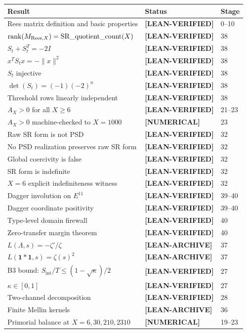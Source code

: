 \documentclass[11pt]{article}
\theoremstyle{remark}
\newcommand{\LEANVERIFIED}{\textbf{\color{green!60!black}[LEAN-VERIFIED]}}
\newcommand{\NUMERICAL}{\textbf{\color{orange}[NUMERICAL]}}
\newcommand{\LEANARCHIVE}{\textbf{\color{gray}[LEAN-ARCHIVE]}}
\DeclareRobustCommand{\_}{\ifmmode\text{\textunderscore}\else\textunderscore\allowbreak\fi}
\begin{document}
\begin{longtable}{p{8cm}ll}
\toprule
Result & Status & Stage \\
\midrule
Rees matrix definition and basic properties & \LEANVERIFIED{} & 0--10 \\
$\operatorname{rank}(M_{\mathrm{Rees},X}) = \mathrm{SR\_quotient\_count}(X)$ & \LEANVERIFIED{} & 38 \\
$S_t + S_t^T = -2I$ & \LEANVERIFIED{} & 38 \\
$x^T S_t x = -\|x\|^2$ & \LEANVERIFIED{} & 38 \\
$S_t$ injective & \LEANVERIFIED{} & 38 \\
$\det(S_t) = (-1)(-2)^n$ & \LEANVERIFIED{} & 38 \\
Threshold rows linearly independent & \LEANVERIFIED{} & 38 \\
$A_X > 0$ for all $X \geq 6$ & \LEANVERIFIED{} & 21--23 \\
$A_X > 0$ machine-checked to $X=1000$ & \NUMERICAL{} & 23 \\
Raw SR form is not PSD & \LEANVERIFIED{} & 32 \\
No PSD realization preserves raw SR form & \LEANVERIFIED{} & 32 \\
Global coercivity is false & \LEANVERIFIED{} & 32 \\
SR form is indefinite & \LEANVERIFIED{} & 32 \\
$X=6$ explicit indefiniteness witness & \LEANVERIFIED{} & 32 \\
Dagger involution on $E^{11}$ & \LEANVERIFIED{} & 39--40 \\
Dagger coordinate positivity & \LEANVERIFIED{} & 39--40 \\
Type-level domain firewall & \LEANVERIFIED{} & 40 \\
Zero-transfer margin theorem & \LEANVERIFIED{} & 40 \\
$L(\Lambda,s) = -\zeta'/\zeta$ & \LEANARCHIVE{} & 37 \\
$L(\mathbf{1}*\mathbf{1},s) = \zeta(s)^2$ & \LEANARCHIVE{} & 37 \\
B3 bound: $S_{\mathrm{int}}/T \leq (1-\sqrt{\kappa})/2$ & \LEANVERIFIED{} & 27 \\
$\kappa \in [0,1]$ & \LEANVERIFIED{} & 27 \\
Two-channel decomposition & \LEANVERIFIED{} & 28 \\
Finite Mellin kernels & \LEANARCHIVE{} & 36 \\
Primorial balance at $X=6,30,210,2310$ & \NUMERICAL{} & 19--23 \\

\end{longtable}
\end{document}
